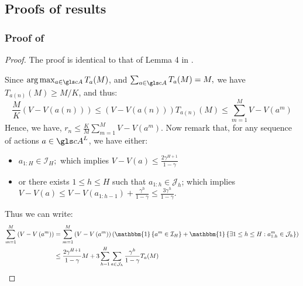 \subsection{Proofs of \KLOLOP results}
\label{sec:kl-olop-proofs}

\subsubsection{Proof of }
\label{sec:proof-lem-expected-regret}
\begin{proof}
	The proof is identical to that of Lemma 4 in \citep{Bubeck2010}.
	
	Since $\arg \max _{a \in \cA} T_{a}(M)$, and $\sum_{a \in \cA} T_{a}(M)=M,$ we have $T_{a(n)}(M) \geq M / K$, and thus:
	\begin{equation*}
	\frac{M}{K}(V-V(a(n))) \leq(V-V(a(n))) T_{a(n)}(M) \leq \sum_{m=1}^{M} V-V\left(a^{m}\right)
	\end{equation*}
	Hence, we have, $r_{n} \leq \frac{K}{M} \sum_{m=1}^{M} V-V\left(a^{m}\right)$. Now remark that, for any sequence of actions $a\in \cA^L$, we have either:
	\begin{itemize}
		\item $a_{1 : H} \in \mathcal{I}_{H} ;$ which implies $V-V(a) \leq \frac{2 \gamma^{H+1}}{1-\gamma}$
		\item or there exists $1\leq h \leq H$ such that $a_{1:h} \in \mathcal{J}_h$; which implies $V-V(a) \leq V-V\left(a_{1 : h-1}\right)+\frac{\gamma^{h}}{1-\gamma} \leq \frac{3 \gamma^{h}}{1-\gamma}$.
	\end{itemize}
	Thus we can write:
	\begin{equation*}
	\begin{aligned} \sum_{m=1}^{M}\left(V-V\left(a^{m}\right)\right) &=\sum_{m=1}^{M}\left(V-V\left(a^{m}\right)\right)\left(\mathbbm{1}\left\{a^{m} \in \mathcal{I}_{H}\right\}+\mathbbm{1}\left\{\exists 1 \leq h \leq H : a_{1 : h}^{m} \in \mathcal{J}_{h}\right\}\right) \\ & \leq \frac{2 \gamma^{H+1}}{1-\gamma} M+3 \sum_{h=1}^{H} \sum_{a \in \mathcal{J}_{h}} \frac{\gamma^{h}}{1-\gamma} T_{a}(M) \end{aligned}
	\end{equation*}
	
\end{proof}

